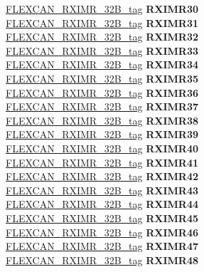 \begin{DoxyCompactItemize}
\begin{tabbing}
\>\>\mbox{\hyperlink{unionFLEXCAN__RXIMR__32B__tag}{FLEXCAN\_RXIMR\_32B\_tag}} {\bfseries RXIMR30}\\
\>\>\mbox{\hyperlink{unionFLEXCAN__RXIMR__32B__tag}{FLEXCAN\_RXIMR\_32B\_tag}} {\bfseries RXIMR31}\\
\>\>\mbox{\hyperlink{unionFLEXCAN__RXIMR__32B__tag}{FLEXCAN\_RXIMR\_32B\_tag}} {\bfseries RXIMR32}\\
\>\>\mbox{\hyperlink{unionFLEXCAN__RXIMR__32B__tag}{FLEXCAN\_RXIMR\_32B\_tag}} {\bfseries RXIMR33}\\
\>\>\mbox{\hyperlink{unionFLEXCAN__RXIMR__32B__tag}{FLEXCAN\_RXIMR\_32B\_tag}} {\bfseries RXIMR34}\\
\>\>\mbox{\hyperlink{unionFLEXCAN__RXIMR__32B__tag}{FLEXCAN\_RXIMR\_32B\_tag}} {\bfseries RXIMR35}\\
\>\>\mbox{\hyperlink{unionFLEXCAN__RXIMR__32B__tag}{FLEXCAN\_RXIMR\_32B\_tag}} {\bfseries RXIMR36}\\
\>\>\mbox{\hyperlink{unionFLEXCAN__RXIMR__32B__tag}{FLEXCAN\_RXIMR\_32B\_tag}} {\bfseries RXIMR37}\\
\>\>\mbox{\hyperlink{unionFLEXCAN__RXIMR__32B__tag}{FLEXCAN\_RXIMR\_32B\_tag}} {\bfseries RXIMR38}\\
\>\>\mbox{\hyperlink{unionFLEXCAN__RXIMR__32B__tag}{FLEXCAN\_RXIMR\_32B\_tag}} {\bfseries RXIMR39}\\
\>\>\mbox{\hyperlink{unionFLEXCAN__RXIMR__32B__tag}{FLEXCAN\_RXIMR\_32B\_tag}} {\bfseries RXIMR40}\\
\>\>\mbox{\hyperlink{unionFLEXCAN__RXIMR__32B__tag}{FLEXCAN\_RXIMR\_32B\_tag}} {\bfseries RXIMR41}\\
\>\>\mbox{\hyperlink{unionFLEXCAN__RXIMR__32B__tag}{FLEXCAN\_RXIMR\_32B\_tag}} {\bfseries RXIMR42}\\
\>\>\mbox{\hyperlink{unionFLEXCAN__RXIMR__32B__tag}{FLEXCAN\_RXIMR\_32B\_tag}} {\bfseries RXIMR43}\\
\>\>\mbox{\hyperlink{unionFLEXCAN__RXIMR__32B__tag}{FLEXCAN\_RXIMR\_32B\_tag}} {\bfseries RXIMR44}\\
\>\>\mbox{\hyperlink{unionFLEXCAN__RXIMR__32B__tag}{FLEXCAN\_RXIMR\_32B\_tag}} {\bfseries RXIMR45}\\
\>\>\mbox{\hyperlink{unionFLEXCAN__RXIMR__32B__tag}{FLEXCAN\_RXIMR\_32B\_tag}} {\bfseries RXIMR46}\\
\>\>\mbox{\hyperlink{unionFLEXCAN__RXIMR__32B__tag}{FLEXCAN\_RXIMR\_32B\_tag}} {\bfseries RXIMR47}\\
\>\>\mbox{\hyperlink{unionFLEXCAN__RXIMR__32B__tag}{FLEXCAN\_RXIMR\_32B\_tag}} {\bfseries RXIMR48}\\

\end{tabbing}
\end{DoxyCompactItemize}
